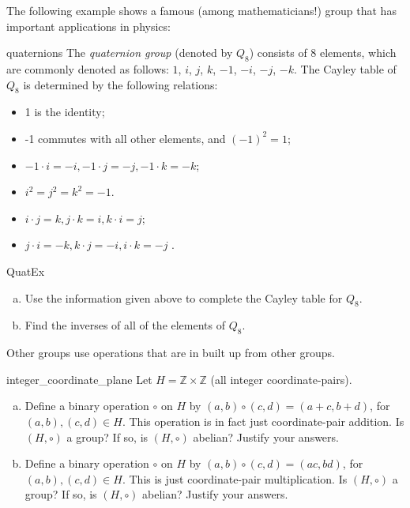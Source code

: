 The following example shows a famous (among mathematicians!) group that has important applications in physics:

\begin{example}{quaternions}
The \emph{quaternion group} (denoted by $Q_8$) consists of 8 elements, which are commonly denoted as follows: $1$, $i$, $j$, $k$, $-1$, $-i$, $-j$, $-k$. The Cayley table of $Q_8$ is determined by the following relations:
\begin{itemize}
\item
1 is the identity;
\item
-1 commutes with all other elements, and $(-1)^2=1$;
\item
$-1 \cdot i = -i, -1 \cdot j = -j, -1 \cdot k = -k$;
\item
$i^2 = j^2=k^2 = -1$.
\item
$i \cdot j = k, j \cdot k = i, k \cdot i=j$;
\item
$j \cdot i = -k, k \cdot j=-i, i \cdot k = -j$ .
\end{itemize}
\end{example}

\begin{exercise}{QuatEx}
\begin{enumerate}[(a)]
\item
Use the information given above to complete the Cayley table for $Q_8$.
\item
Find the inverses of all of the elements of $Q_8$.
\end{enumerate}
\end{exercise}

\medskip{}
Other groups use operations that are in built up from other groups.

\begin{exercise}{integer_coordinate_plane}
Let $H = {\mathbb Z} \times {\mathbb Z}$ (all integer coordinate-pairs).
\begin{enumerate}[(a)]
\item
Define a binary operation $\circ$ on $H$ by  $(a,b) \circ (c,d) = (a + c , b + d)$, for $(a,b), (c,d) \in H$.  This operation is in fact just coordinate-pair addition.  Is $(H , \circ)$ a group?  If so, is $(H , \circ)$ abelian?  Justify your answers.
\item
Define a binary operation $\circ$ on $H$ by $(a,b) \circ (c,d) = (ac , bd)$, for $(a,b), (c,d) \in H$.  This is just coordinate-pair multiplication.  Is $(H , \circ)$ a group?  If so, is $(H , \circ)$ abelian? Justify your answers.
\end{enumerate}
\end{exercise}

